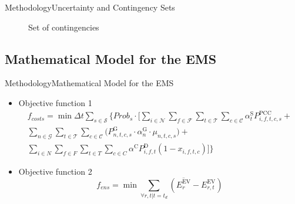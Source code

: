 \documentclass[10pt, aspectratio=1610]{beamer}
\begin{document}
\begin{frame}{Methodology}{Uncertainty and Contingency Sets}
\begin{figure}
        \caption{Set of contingencies}
    \end{figure}
\end{frame}

\subsection{Mathematical Model for the EMS}

\begin{frame}{Methodology}{Mathematical Model for the EMS}
\begin{itemize}[<+->]
    \item Objective function 1
    \begin{multline}\label{obj_1}
        {f_{costs}} = \min \Delta t \sum_{s \in \mathcal{S}} 
            \Biggl\{ \mathit{Prob}_{s} \cdot \Bigg[
                \sum_{i \in \mathcal{N}} 
                \sum_{f \in \mathcal{F}} 
                \sum_{t \in \mathcal{T}} 
                \sum_{c \in \mathcal{C}} 
        \alpha_{t}^{\text{S}} P_{i,f,t,c,s}^{\text{PCC}} + \\
            \sum_{n \in \mathcal{G}} 
            \sum_{t \in \mathcal{T}} 
            \sum_{c \in \mathcal{C}} 
        \Big(P^{\text{G}}_{n,t,c,s} \cdot \alpha_{n}^{\text{G}} \cdot \mu_{n,t,c,s} \Big) + \\
            \sum_{i \in \mathit{N}} 
            \sum_{f \in \mathit{F}}
            \sum_{t \in \mathit{T}}
            \sum_{c \in \mathit{C}} \alpha^{\text{C}} P_{i,f,t}^{\text{D}} 
                (1 - x_{i,f,t,c}) \Bigg] \Biggr\} 
        \end{multline}

    \item Objective function 2
    \begin{equation}\label{obj_2}
            {f_{ens}} = \min \sum_{\forall r,t | t=t_{d}} 
                \left( \overline{{E}_{r}^{\mathrm{EV}}} - {E}_{r,t}^{\mathrm{EV}} \right)
    \end{equation}
\end{itemize}

\end{frame}
\end{document}
